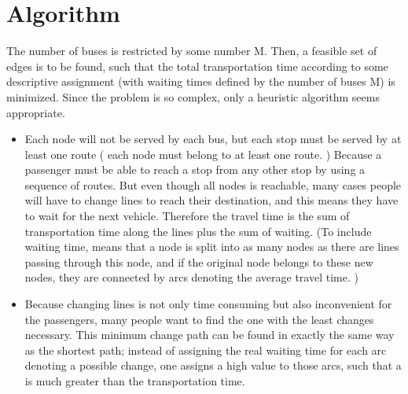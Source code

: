 \section{Algorithm}

The number of buses is restricted by some number M. Then, a feasible set of edges is to be found, such that the total transportation time according to some descriptive assignment (with waiting times defined by the number of buses M) is minimized. Since the problem is so complex, only a heuristic algorithm seems appropriate. 
\begin{itemize}
 \item Each node will not be served by each bus, but each stop must be served by at least one route ( each node must belong to at least one route. ) Because a passenger must be able to reach a stop from any other stop by using a sequence of routes. But even though all nodes is reachable, many cases people will have to change lines to reach their destination, and this means they have to wait for the next vehicle. Therefore the travel time is the sum of transportation time along the lines plus the sum of waiting. (To include waiting time, means that a node is split into as many nodes as there are lines passing through this node, and if the original node belongs to these new nodes, they are connected by arcs denoting the average travel time. )
 \item Because changing lines is not only time consuming but also inconvenient for the passengers, many people want to find the one with the least changes necessary. This minimum change path can be found in exactly the same way as the shortest path; instead of assigning the real waiting time for each arc denoting a possible change, one assigns a high value to those arcs, such that a is much greater than the transportation time.
\end{itemize}

